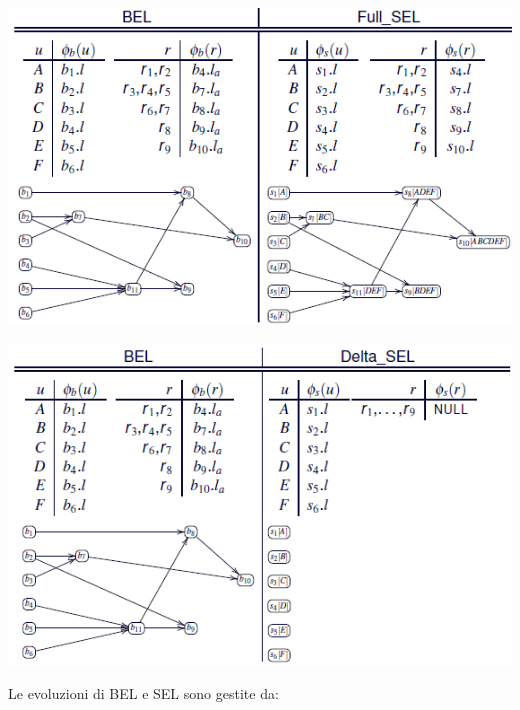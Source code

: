 \begin{center}
    \includegraphics[scale=0.7]{img/belsel2.png}
\end{center}
\begin{center}
    \includegraphics[scale=0.7]{img/belsel3.png}
\end{center}
Le evoluzioni di BEL e SEL sono gestite da:
